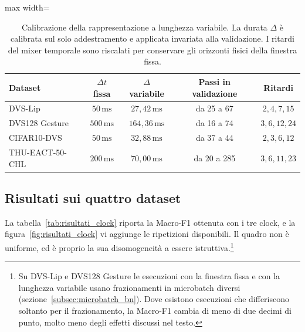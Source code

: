 \begin{table}[tb]
\centering
\small
\renewcommand{\arraystretch}{1.2}
\caption[Calibrazione della rappresentazione a lunghezza variabile]{Calibrazione della rappresentazione a lunghezza variabile. La durata $\Delta$ è calibrata sul solo addestramento e applicata invariata alla validazione. I ritardi del mixer temporale sono riscalati per conservare gli orizzonti fisici della finestra fissa.}
\label{tab:calibrazione_vc}
\begin{adjustbox}{max width=\textwidth}
\begin{tabular}{@{}l c c c c@{}}
\hline
\textbf{Dataset} & \textbf{$\Delta t$ fissa} & \textbf{$\Delta$ variabile} & \textbf{Passi in validazione} & \textbf{Ritardi} \\
\hline
DVS-Lip & $50\,\mathrm{ms}$ & $27{,}42\,\mathrm{ms}$ & da 25 a 67 & $2,4,7,15$ \\
DVS128 Gesture & $500\,\mathrm{ms}$ & $164{,}36\,\mathrm{ms}$ & da 16 a 74 & $3,6,12,24$ \\
CIFAR10-DVS & $50\,\mathrm{ms}$ & $32{,}88\,\mathrm{ms}$ & da 37 a 44 & $2,3,6,12$ \\
THU-EACT-50-CHL & $200\,\mathrm{ms}$ & $70{,}00\,\mathrm{ms}$ & da 20 a 285 & $3,6,11,23$ \\
\hline
\end{tabular}
\end{adjustbox}
\end{table}

\subsection{Risultati sui quattro dataset}
\label{subsec:risultati_clock}

La tabella~\ref{tab:risultati_clock} riporta la Macro-F1 ottenuta con i tre clock, e la figura~\ref{fig:risultati_clock} vi aggiunge le ripetizioni disponibili. Il quadro non è uniforme, ed è proprio la sua disomogeneità a essere istruttiva.\footnote{Su DVS-Lip e DVS128 Gesture le esecuzioni con la finestra fissa e con la lunghezza variabile usano frazionamenti in microbatch diversi (sezione~\ref{subsec:microbatch_bn}). Dove esistono esecuzioni che differiscono soltanto per il frazionamento, la Macro-F1 cambia di meno di due decimi di punto, molto meno degli effetti discussi nel testo.}

